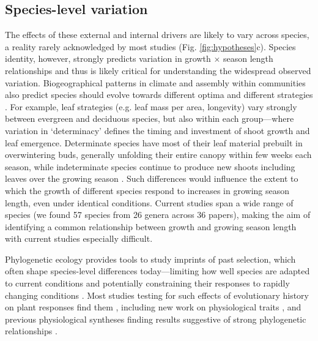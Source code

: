 \documentclass[11pt]{article}
\begin{document}
\subsection*{Species-level variation}
The effects of these external and internal drivers are likely to vary across species, a reality rarely acknowledged by most studies (Fig. \ref{fig:hypotheses}c). Species identity, however, strongly predicts variation in growth $\times$ season length relationships \citep[e.g.][]{cuny2012life,michelot2012comparing} and thus is likely critical for understanding the widespread observed variation. Biogeographical patterns in climate and assembly within communities also predict species should evolve towards different optima and different strategies \citep{Ackerly:2009ly,buckley2012functional}. For example, leaf strategies (e.g. leaf mass per area, longevity) vary strongly between evergreen and deciduous species, but also within each group---where variation in `determinacy' defines the timing and investment of shoot growth and leaf emergence. Determinate species have most of their leaf material prebuilt in overwintering buds, generally unfolding their entire canopy within few weeks each season, while indeterminate species continue to produce new shoots including leaves over the growing season \citep{kikuzawa1982leaf,Lechowicz:1984cr}. Such differences would influence the extent to which the growth of different species respond to increases in growing season length, even under identical conditions. Current studies span a wide range of species (we found  57 species from 26 genera across 36 papers), making the aim of identifying a common relationship between growth and growing season length with current studies especially difficult.

Phylogenetic ecology provides tools to study imprints of past selection, which often shape species-level differences today---limiting how well species are adapted to current conditions and potentially constraining their responses to rapidly changing conditions \citep{Ackerly:2009ly}.  %
Most studies testing for such effects of evolutionary history on plant responses find them \citep[e.g.][]{phenophylo}, including new work on physiological traits \citep{avila2023evidence}, and previous physiological syntheses finding results suggestive of strong phylogenetic relationships \citep[e.g.][]{way2010differential}.
\end{document}
